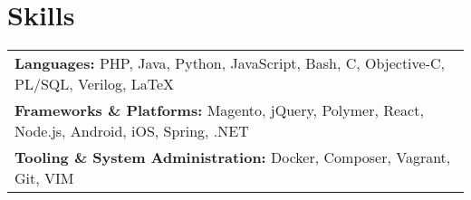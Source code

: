 \documentclass[line]{resume}
\begin{document}

\vspace{-2px}
\section{Skills}
\vspace{-1px}
\begin{tabularx}{\linewidth}{X}
	\textbf{Languages:} PHP, Java, Python, JavaScript, Bash, C, Objective-C, PL/SQL, Verilog, \LaTeX \\
	\textbf{Frameworks \& Platforms:} Magento, jQuery, Polymer, React, Node.js, Android, iOS, Spring, .NET \\
	\textbf{Tooling \& System Administration:} Docker, Composer, Vagrant, Git, VIM \\
\end{tabularx}
\end{document}
